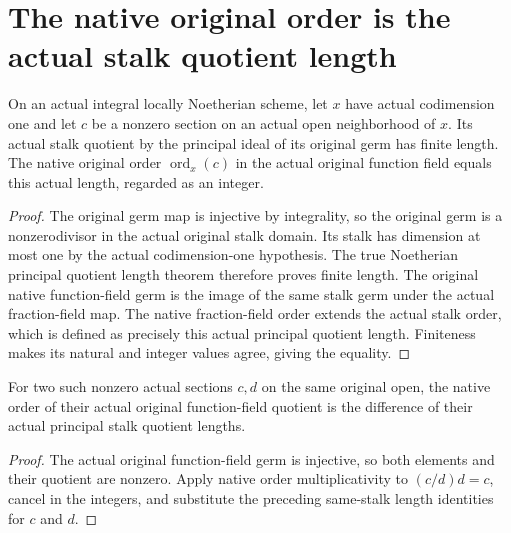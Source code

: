 \section{The native original order is the actual stalk quotient length}

\begin{theorem}
\label{thm:fc-scheme-order-local-length}
\leanok
{}
On an actual integral locally Noetherian scheme, let $x$ have actual
codimension one and let $c$ be a nonzero section on an actual open
neighborhood of $x$. Its actual stalk quotient by the principal ideal
of its original germ has finite length. The native original order
$\operatorname{ord}_x(c)$ in the actual original function field equals
this actual length, regarded as an integer.
\end{theorem}
\begin{proof}
The original germ map is injective by integrality, so the original germ
is a nonzerodivisor in the actual original stalk domain. Its stalk
has dimension at most one by the actual codimension-one hypothesis.
The true Noetherian principal quotient length theorem therefore proves
finite length. The original native function-field germ is the image
of the same stalk germ under the actual fraction-field map. The native
fraction-field order extends the actual stalk order, which is defined
as precisely this actual principal quotient length. Finiteness makes
its natural and integer values agree, giving the equality.
\end{proof}

\begin{theorem}
\label{thm:fc-scheme-rational-order-local-length}
\leanok
{}
For two such nonzero actual sections $c,d$ on the same original open,
the native order of their actual original function-field quotient is
the difference of their actual principal stalk quotient lengths.
\end{theorem}
\begin{proof}
The actual original function-field germ is injective, so both elements
and their quotient are nonzero. Apply native order multiplicativity
to $(c/d)d=c$, cancel in the integers, and substitute the preceding
same-stalk length identities for $c$ and $d$.
\end{proof}
